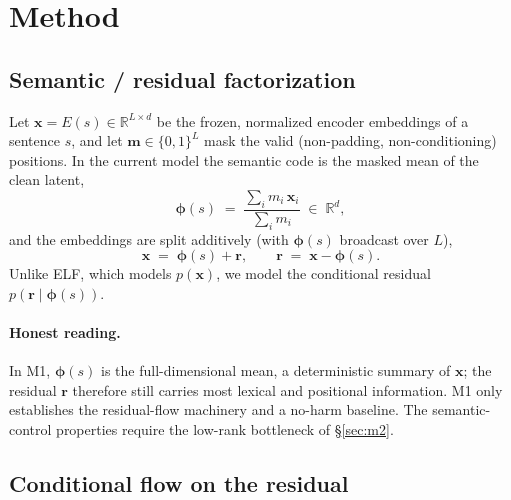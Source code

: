 \documentclass[11pt]{article}
\newcommand{\R}{\mathbb{R}}
\newcommand{\xb}{\bm{x}}
\newcommand{\rb}{\bm{r}}
\newcommand{\phib}{\bm{\phi}}
\newcommand{\impl}{}
\begin{document}
\section{Method}
\label{sec:method}

\subsection{Semantic / residual factorization \impl}

Let $\xb = E(s) \in \R^{L\times d}$ be the frozen, normalized encoder embeddings
of a sentence $s$, and let $\bm{m}\in\{0,1\}^{L}$ mask the valid
(non-padding, non-conditioning) positions. In the current model the semantic
code is the masked mean of the clean latent,
\begin{equation}
  \phib(s) \;=\; \frac{\sum_{i} m_i\,\xb_i}{\sum_i m_i}\;\in\;\R^{d},
  \label{eq:phi}
\end{equation}
and the embeddings are split additively (with $\phib(s)$ broadcast over $L$),
\begin{equation}
  \xb \;=\; \phib(s) + \rb,
  \qquad
  \rb \;=\; \xb - \phib(s).
\end{equation}
Unlike ELF, which models $p(\xb)$, we model the conditional residual
$p(\rb \mid \phib(s))$.

\paragraph{Honest reading.} In M1, $\phib(s)$ is the full-dimensional mean, a
deterministic summary of $\xb$; the residual $\rb$ therefore still carries most
lexical and positional information. M1 only establishes the residual-flow
machinery and a no-harm baseline. The semantic-control properties require the
low-rank bottleneck of \S\ref{sec:m2}.

\subsection{Conditional flow on the residual \impl}
\end{document}

